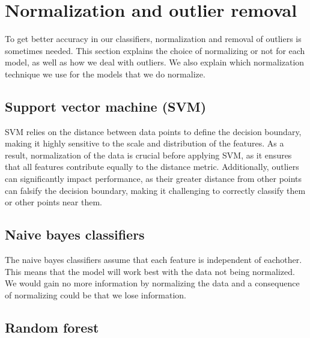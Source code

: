 \section{Normalization and outlier removal}

To get better accuracy in our classifiers, normalization and removal of outliers is sometimes needed. This section explains the choice of normalizing or not for each model, as well as how we deal with outliers. We also explain which normalization technique we use for the models that we do normalize. 

\subsection{Support vector machine (SVM)}
SVM relies on the distance between data points to define the decision boundary, making it highly sensitive to the scale and distribution of the features. As a result, normalization of the data is crucial before applying SVM, as it ensures that all features contribute equally to the distance metric.
Additionally, outliers can significantly impact performance, as their greater distance from other points can falsify the decision boundary, making it challenging to correctly classify them or other points near them.
\subsection{Naive bayes classifiers}

The naive bayes classifiers assume that each feature is independent of eachother. This means that the model will work best with the data not being normalized. We would gain no more information by normalizing the data and a consequence of normalizing could be that we lose information.

\subsection{Random forest}